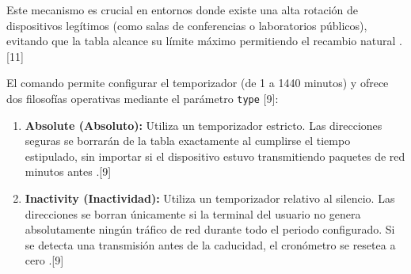 \documentclass[a4paper,12pt]{article}
\begin{document}
Este mecanismo es crucial en entornos donde existe una alta rotación de dispositivos legítimos (como salas de conferencias o laboratorios públicos), evitando que la tabla alcance su límite máximo permitiendo el recambio natural \cite{networklessons_aging}.[11]

El comando permite configurar el temporizador (de 1 a 1440 minutos) y ofrece dos filosofías operativas mediante el parámetro \texttt{type} \cite{cisco_9200} [9]:
\begin{enumerate}
    \item \textbf{Absolute (Absoluto):} Utiliza un temporizador estricto. Las direcciones seguras se borrarán de la tabla exactamente al cumplirse el tiempo estipulado, sin importar si el dispositivo estuvo transmitiendo paquetes de red minutos antes \cite{cisco_9200}.[9]
    \item \textbf{Inactivity (Inactividad):} Utiliza un temporizador relativo al silencio. Las direcciones se borran únicamente si la terminal del usuario no genera absolutamente ningún tráfico de red durante todo el periodo configurado. Si se detecta una transmisión antes de la caducidad, el cronómetro se resetea a cero \cite{cisco_9200}.[9]
\end{enumerate}

\newpage
\end{document}
